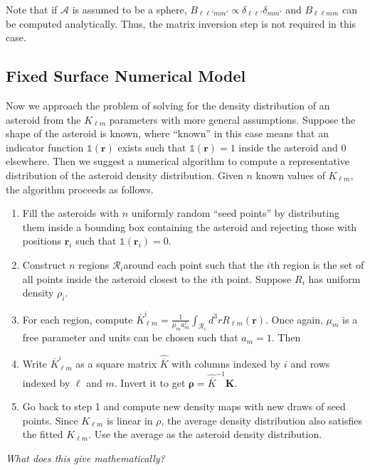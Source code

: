 \documentclass{aastex631}
\newcommand{\jtd}[1]{{\color{red}\textit{#1}}}
\begin{document}
Note that if $\mathcal{A}$ is assumed to be a sphere, $B_{\ell \ell' m m'} \propto \delta_{\ell \ell'} \delta_{m m'}$ and $B_{\ell \ell m m}$ can be computed analytically. Thus, the matrix inversion step is not required in this case.

\subsection{Fixed Surface Numerical Model}
\label{sec:numerical-density}
Now we approach the problem of solving for the density distribution of an asteroid from the $K_{\ell m}$ parameters with more general assumptions. Suppose the shape of the asteroid is known, where ``known'' in this case means that an indicator function $\mathds{1}(\mathbf r)$ exists such that $\mathds{1}(\mathbf r) = 1$  inside the asteroid and 0 elsewhere. Then we suggest a numerical algorithm to compute a representative distribution of the asteroid density distribution. Given $n$ known values of $K_{\ell m}$, the algorithm proceeds as follows.
\begin{enumerate}
\item Fill the asteroids with $n$ uniformly random ``seed points'' by distributing them inside a bounding box containing the asteroid and rejecting those with positions $\mathbf r_i$ such that $\mathds{1}(\mathbf r_i) = 0.$
\item Construct $n$ regions $\mathcal{R}_i$around each point such that the $i$th region is the set of all points inside the asteroid closest to the $i$th point. Suppose $R_i$ has uniform density $\rho_i$.
\item For each region, compute $\overline K_{\ell m}^i = \frac{1}{\mu_m a_m^\ell}\int_{\mathcal{R}_i} d^3 r R_{\ell m}(\mathbf r)$. Once again, $\mu_m$ is a free parameter and units can be chosen such that $a_m=1$. Then %
\item Write $\overline K_{\ell m}^i$ as a square matrix $\hat{\overline K}$ with columns indexed by $i$ and rows indexed by $\ell$ and $m$. Invert it to get $\mathbf \rho = \hat {\overline K}^{-1} \mathbf K$.
\item Go back to step 1 and compute new density maps with new draws of seed points. Since $K_{\ell m}$ is linear in $\rho$, the average density distribution also satisfies the fitted $K_{\ell m}$. Use the average as the asteroid density distribution.
\end{enumerate}

\jtd{What does this give mathematically?}
\end{document}
